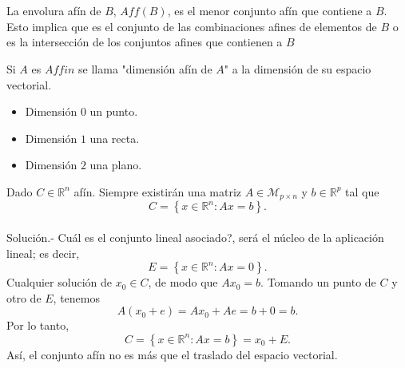 \begin{def.}\,\\\\
    La envolura afín de $B$, $Aff(B)$, es el menor conjunto afín que contiene a $B$. Esto implica que es el conjunto de las combinaciones afines de elementos de $B$ o es la intersección de los conjuntos afines que contienen a $B$ 
\end{def.}

\begin{def.}
    Si $A$ es $Affin$ se llama "dimensión afín de $A$" a la dimensión de su espacio vectorial.
\end{def.}

\begin{itemize}
    \item Dimensión $0$ un punto.
    \item Dimensión $1$ una recta.
    \item Dimensión $2$ una plano.
\end{itemize}



\begin{ejem}
    Dado $C\in \mathbb{R}^n$ afín. Siempre existirán una matriz $A\in \mathcal{M}_{p\times n}$ y $b\in \mathbb{R}^p$ tal que
    $$C=\left\{x\in \mathbb{R}^n:Ax=b\right\}.$$\\
	Solución.-\; Cuál es el conjunto lineal asociado?, será el núcleo de la aplicación lineal; es decir,
	$$E=\left\{x\in \mathbb{R}^n:Ax=0\right\}.$$
	Cualquier solución de $x_0\in C$, de modo que $Ax_0=b$. Tomando un punto de $C$ y otro de $E$, tenemos 
	$$A(x_0+e)=Ax_0+Ae=b+0=b.$$
	Por lo tanto,
	$$C=\left\{x\in \mathbb{R}^n:Ax=b\right\}=x_0+E.$$
	Así, el conjunto afín no es más que el traslado del espacio vectorial.
\end{ejem}

